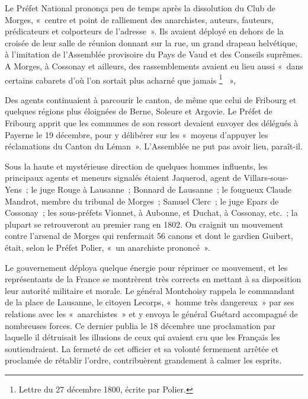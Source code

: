 \documentclass[french,twoside]{book} %
\begin{document}
\noindent Le Préfet National prononça peu de temps après la dissolution du Club de Morges, « centre et point de ralliement des anarchistes, auteurs, fauteurs, prédicateurs et colporteurs de l’adresse ». Ils avaient déployé en dehors de la croisée de leur salle de réunion donnant sur la rue, un grand drapeau helvétique, à l’imitation de l’Assemblée provisoire du Pays de Vaud et des Conseils suprêmes. A Morges, à Cossonay et ailleurs, des rassemblements avaient eu lieu aussi « dans certains cabarets d’où l’on sortait plus acharné que jamais \footnote{Lettre du 27 décembre 1800, écrite par Polier.}  »,\par
Des agents continuaient à parcourir le canton, de même que celui de Fribourg et quelques régions plus éloignées de Berne, Soleure et Argovie. Le Préfet de Fribourg apprit que les communes de son ressort devaient envoyer des délégués à Payerne le 19 décembre, pour y délibérer sur les « moyens d’appuyer les réclamations du Canton du Léman ». L’Assemblée ne put pas avoir lieu, paraît-il.\par
Sous la haute et mystérieuse direction de quelques hommes influents, les principaux agents et meneurs signalés étaient Jaquerod, agent de Villars-sous-Yens ; le juge Rouge à Lausanne ; Bonnard de Lausanne ; le fougueux Claude Mandrot, membre du tribunal de Morges ; Samuel Clerc ; le juge Epars de Cossonay ; les sous-préfets Vionnet, à Aubonne, et Duchat, à Cossonay, etc. ; la plupart se retrouveront au premier rang en 1802. On craignit un mouvement contre l’arsenal de Morges qui renfermait 56 canons et dont le gardien Guibert, était, selon le Préfet Polier, « un anarchiste prononcé ».\par
Le gouvernement déploya quelque énergie pour réprimer ce mouvement, et les représentants de la France se montrèrent très corrects en mettant à sa disposition leur autorité militaire et morale. Le général Montchoisy rappela le commandant de la place de Lausanne, le citoyen Lecorps, « homme très dangereux » par ses relations avec les « anarchistes » et y envoya le général Guétard accompagné de nombreuses forces. Ce dernier publia le 18 décembre une proclamation par laquelle il détruisait les illusions de ceux qui avaient cru que les Français les soutiendraient. La fermeté de cet officier et sa volonté fermement arrêtée et proclamée de rétablir l’ordre, contribuèrent grandement à calmer les esprits.\par
\end{document}
